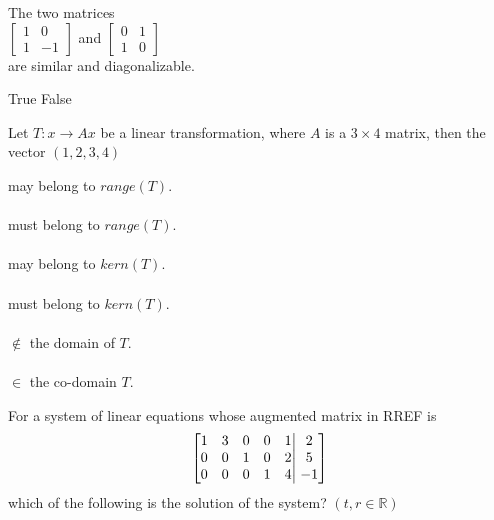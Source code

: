 \documentclass[12pt, answers]{exam}
\newcommand{\ibmatrix}[1]{\begin{bmatrix}#1\end{bmatrix}} %
\newcommand{\separator}{\noindent{\rule[1ex]{0.45\textwidth}{.1pt}}}
\newcommand{\newquestion}[3][x 1 mark(s)]{
    {\fontsize{12}{14}\selectfont
    \uplevel{\separator \\[-2mm] [Qu.]
    \fontsize{14}{16}\selectfont
    \ifthenelse{\equal{#2}{}}{[1 mark(s)]}{[#2 #1]}
    \ifthenelse{\equal{#3}{}}{\ \\[-7mm]}{\\#3\\[-1em]}}
    }}
\newcommand{\nextcol}{\vfill\mbox{}\columnbreak}
\begin{document}
\begin{multicols*}{2}
\begin{questions}
		\newquestion{}{}
		\question[1] The two matrices\\
		$\ibmatrix{1&0\\1&-1}$ and $\ibmatrix{0&1\\1&0}$\\
		are similar and diagonalizable.
	
		\begin{oneparchoices}
			\choice True \quad \choice False
		\end{oneparchoices}

		\nextcol

		\newquestion{}{}
		\question Let $T : x \rightarrow Ax$ be a linear transformation, where $A$ is a $3\times4$ matrix, then the vector $(1,2,3,4)$

		\begin{oneparchoices}
			\choice may belong to $range(T)$.\\\\
			\choice must belong to $range(T)$.\\\\
			\choice may belong to $kern(T)$.\\\\
			\choice must belong to $kern(T)$.\\\\
			\choice $\notin$ the domain of $T$.\\\\
			\choice $\in$ the co-domain $T$.\\
		\end{oneparchoices}

		\newpage
		\newquestion{}{}
		\question[1] For a system of linear equations whose augmented matrix in RREF is\\
		\begin{equation}
			\left \lbrack \begin{matrix}
				1 & 3 & 0 & 0 & 1\\
				0 & 0 & 1 & 0 & 2\\
				0 & 0 & 0 & 1 & 4
			\end{matrix} \right \vert
			\left . \begin{matrix}
				2 \\ 5 \\ -1
			\end{matrix} \right \rbrack \notag
		\end{equation}
		which of the following is the solution of the system? $(t,r \in \mathbb{R})$ \linebreak


\end{questions}
\end{multicols*}
\end{document}
